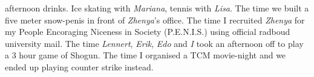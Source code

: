 afternoon drinks. Ice skating with \emph{Mariana}, tennis with \emph{Lisa}. The time we built a five meter snow-penis in front of \emph{Zhenya}'s office. The time I recruited \emph{Zhenya} for my People Encoraging Niceness in Society (P.E.N.I.S.) using official radboud university mail. The time \emph{Lennert}, \emph{Erik}, \emph{Edo} and \emph{I} took an afternoon off to play a 3 hour game of Shogun. The time I organised a TCM movie-night and we ended up playing counter strike instead. 


\endgroup
